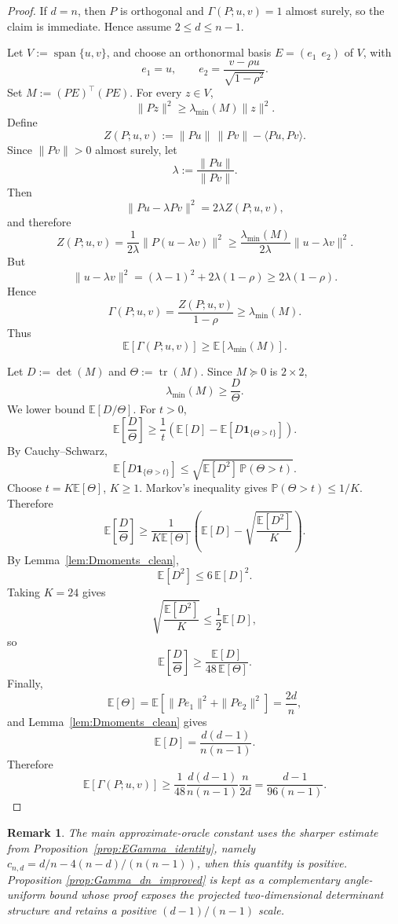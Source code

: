 \documentclass{article}
\newtheorem{remark}{Remark}
\begin{document}
\begin{proof}
If \(d=n\), then \(P\) is orthogonal and
\(\Gamma(P;u,v)=1\) almost surely, so the claim is immediate. Hence assume
\(2\le d\le n-1\).

Let \(V:=\operatorname{span}\{u,v\}\), and choose an orthonormal basis
\(E=(e_1\ \ e_2)\) of \(V\), with
\[
    e_1=u,\qquad
    e_2=\frac{v-\rho u}{\sqrt{1-\rho^2}}.
\]
Set \(M:=(PE)^\top(PE)\). For every \(z\in V\),
\[
    \|Pz\|^2\ge \lambda_{\min}(M)\|z\|^2 .
\]
Define
\[
    Z(P;u,v):=\|Pu\|\,\|Pv\|-\langle Pu,Pv\rangle.
\]
Since \(\|Pv\|>0\) almost surely, let
\[
    \lambda:=\frac{\|Pu\|}{\|Pv\|}.
\]
Then
\[
    \|Pu-\lambda Pv\|^2=2\lambda Z(P;u,v),
\]
and therefore
\[
    Z(P;u,v)
    =
    \frac{1}{2\lambda}\|P(u-\lambda v)\|^2
    \ge
    \frac{\lambda_{\min}(M)}{2\lambda}\|u-\lambda v\|^2.
\]
But
\[
    \|u-\lambda v\|^2
    =
    (\lambda-1)^2+2\lambda(1-\rho)
    \ge
    2\lambda(1-\rho).
\]
Hence
\[
    \Gamma(P;u,v)
    =
    \frac{Z(P;u,v)}{1-\rho}
    \ge
    \lambda_{\min}(M).
\]
Thus
\[
    \mathbb E[\Gamma(P;u,v)]
    \ge
    \mathbb E[\lambda_{\min}(M)].
\]

Let \(D:=\det(M)\) and \(\Theta:=\operatorname{tr}(M)\). Since \(M\succeq0\) is
\(2\times2\),
\[
    \lambda_{\min}(M)\ge \frac{D}{\Theta}.
\]
We lower bound \(\mathbb E[D/\Theta]\). For \(t>0\),
\[
\mathbb E\!\left[\frac{D}{\Theta}\right]
\ge
\frac1t\left(
    \mathbb E[D]
    -
    \mathbb E[D\mathbf 1_{\{\Theta>t\}}]
\right).
\]
By Cauchy--Schwarz,
\[
    \mathbb E[D\mathbf 1_{\{\Theta>t\}}]
    \le
    \sqrt{\mathbb E[D^2]\,\mathbb P(\Theta>t)}.
\]
Choose \(t=K\mathbb E[\Theta]\), \(K\ge1\). Markov's inequality gives
\(\mathbb P(\Theta>t)\le1/K\). Therefore
\[
\mathbb E\!\left[\frac{D}{\Theta}\right]
\ge
\frac{1}{K\mathbb E[\Theta]}
\left(
    \mathbb E[D]
    -
    \sqrt{\frac{\mathbb E[D^2]}{K}}
\right).
\]
By Lemma~\ref{lem:Dmoments_clean},
\[
    \mathbb E[D^2]\le 6\,\mathbb E[D]^2.
\]
Taking \(K=24\) gives
\[
    \sqrt{\frac{\mathbb E[D^2]}{K}}
    \le
    \frac12\mathbb E[D],
\]
so
\[
    \mathbb E\!\left[\frac{D}{\Theta}\right]
    \ge
    \frac{\mathbb E[D]}{48\,\mathbb E[\Theta]}.
\]
Finally,
\[
    \mathbb E[\Theta]
    =
    \mathbb E[\|Pe_1\|^2+\|Pe_2\|^2]
    =
    \frac{2d}{n},
\]
and Lemma~\ref{lem:Dmoments_clean} gives
\[
    \mathbb E[D]=\frac{d(d-1)}{n(n-1)}.
\]
Therefore
\[
\mathbb E[\Gamma(P;u,v)]
\ge
\frac{1}{48}
\frac{d(d-1)}{n(n-1)}
\frac{n}{2d}
=
\frac{d-1}{96(n-1)}.
\]
\end{proof}
\begin{remark}
The main approximate-oracle constant uses the sharper estimate from
Proposition~\ref{prop:EGamma_identity}, namely
\(c_{n,d}=d/n-4(n-d)/(n(n-1))\), when this quantity is positive. Proposition
\ref{prop:Gamma_dn_improved} is kept as a complementary angle-uniform bound
whose proof exposes the projected two-dimensional determinant structure and
retains a positive \((d-1)/(n-1)\) scale.
\end{remark}
\end{document}

